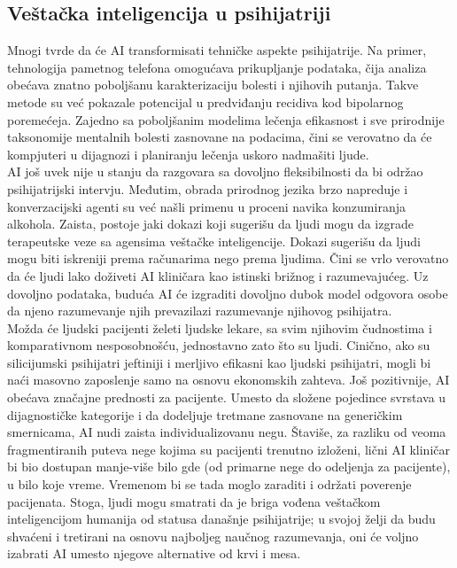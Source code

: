 \documentclass[a4paper]{article}
\begin{document}
\subsection{Veštačka inteligencija u psihijatriji}

Mnogi tvrde da će AI transformisati tehničke aspekte psihijatrije. Na primer, tehnologija pametnog telefona omogućava prikupljanje podataka, čija analiza obećava znatno poboljšanu karakterizaciju bolesti i njihovih putanja. Takve metode su već pokazale potencijal u predviđanju recidiva kod bipolarnog poremećeja. Zajedno sa poboljšanim modelima lečenja efikasnost i sve prirodnije taksonomije mentalnih bolesti zasnovane na podacima, čini se verovatno da će kompjuteri u dijagnozi i planiranju lečenja uskoro nadmašiti ljude.\\
AI još uvek nije u stanju da razgovara sa dovoljno fleksibilnosti da bi održao psihijatrijski intervju. Međutim, obrada prirodnog jezika brzo napreduje i konverzacijski agenti su već našli primenu u proceni navika konzumiranja alkohola. Zaista, postoje jaki dokazi koji sugerišu da ljudi mogu da izgrade terapeutske veze sa agensima veštačke inteligencije. Dokazi sugerišu da ljudi mogu biti iskreniji prema računarima nego prema ljudima. Čini se vrlo verovatno da će ljudi lako doživeti AI kliničara kao istinski brižnog i razumevajućeg. Uz dovoljno podataka, buduća AI će izgraditi dovoljno dubok model odgovora osobe da njeno razumevanje njih prevazilazi razumevanje njihovog psihijatra.\\
Možda će ljudski pacijenti želeti ljudske lekare, sa svim njihovim čudnostima i komparativnom nesposobnošću, jednostavno zato što su ljudi. Cinično, ako su silicijumski psihijatri jeftiniji i merljivo efikasni kao ljudski psihijatri, mogli bi naći masovno zaposlenje samo na osnovu ekonomskih zahteva. Još pozitivnije, AI obećava značajne prednosti za pacijente. Umesto da složene pojedince svrstava u dijagnostičke kategorije i da dodeljuje tretmane zasnovane na generičkim smernicama, AI nudi zaista individualizovanu negu. Štaviše, za razliku od veoma fragmentiranih puteva nege kojima su pacijenti trenutno izloženi, lični AI kliničar bi bio dostupan manje-više bilo gde (od primarne nege do odeljenja za pacijente), u bilo koje vreme. Vremenom bi se tada moglo zaraditi i održati poverenje pacijenata. Stoga, ljudi mogu smatrati da je briga vođena veštačkom inteligencijom humanija od statusa današnje psihijatrije; u svojoj želji da budu shvaćeni i tretirani na osnovu najboljeg naučnog razumevanja, oni će voljno izabrati AI umesto njegove alternative od krvi i mesa.
\end{document}
